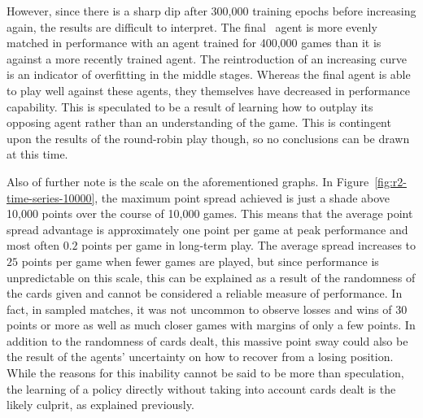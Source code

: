 However,
since there is a sharp dip after 300,000 training epochs before increasing
again,
the results are difficult to interpret.
%
The final \learned\ agent is more evenly matched in performance with an agent
trained for 400,000 games
than it is against a more recently trained agent.
%
The reintroduction of an increasing curve
is an indicator of overfitting in the middle stages.
%
Whereas the final agent is able to play well against these agents,
they themselves have decreased in performance capability.
%
This is speculated to be a result of learning how to outplay its opposing agent
rather than an understanding of the game.
%
This is contingent upon the results of the round-robin play though,
so no conclusions can be drawn at this time.

Also of further note is the scale on the aforementioned graphs.
%
In Figure~\ref{fig:r2-time-series-10000},
the maximum point spread achieved is just a shade above 10,000 points
over the course of 10,000 games.
%
This means that the average point spread advantage is approximately 
one point per game at peak performance\textemdash
and most often $0.2$ points per game\textemdash
in long-term play.
%
The average spread increases to $25$ points per game when fewer games are 
played,
but since performance is unpredictable on this scale,
this can be explained as a result of the randomness of the cards given
and cannot be considered a reliable measure of performance.
%
In fact,
in sampled matches,
it was not uncommon to observe losses and wins of 30 points or more
as well as much closer games with margins of only a few points.
%
In addition to the randomness of cards dealt,
this massive point sway could also be the result of the agents' uncertainty on 
how to recover from a losing position.
%
While the reasons for this inability cannot be said to be more than speculation,
the learning of a policy directly without taking into account cards dealt
is the likely culprit,
as explained previously.




